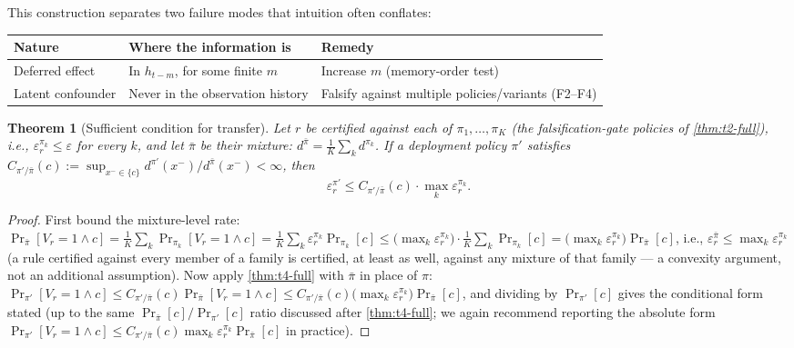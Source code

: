 \documentclass[11pt]{article}
\theoremstyle{plain}
\newtheorem{theorem}{Theorem}[section]
\theoremstyle{definition}
\theoremstyle{remark}
\begin{document}
This construction separates two failure modes that intuition often conflates:
\begin{center}
\begin{tabular}{@{}p{3.1cm}p{3.6cm}p{4.2cm}@{}}
\toprule
Nature & Where the information is & Remedy \\
\midrule
Deferred effect & In $h_{t-m}$, for some finite $m$ & Increase $m$ (memory-order test) \\
Latent confounder & Never in the observation history & Falsify against multiple policies/variants (F2--F4) \\
\bottomrule
\end{tabular}
\end{center}

\begin{theorem}[Sufficient condition for transfer]
\label{thm:t7-full}
Let $r$ be certified against each of $\pi_1,\dots,\pi_K$ (the falsification-gate policies of \autoref{thm:t2-full}), i.e., $\varepsilon^{\pi_k}_r\le\varepsilon$ for every $k$, and let $\bar\pi$ be their mixture: $d^{\bar\pi}=\frac1K\sum_k d^{\pi_k}$. If a deployment policy $\pi'$ satisfies $C_{\pi'/\bar\pi}(c):=\sup_{x^-\in\{c\}}d^{\pi'}(x^-)/d^{\bar\pi}(x^-)<\infty$, then
$$\varepsilon^{\pi'}_r \le C_{\pi'/\bar\pi}(c)\cdot\max_k\varepsilon^{\pi_k}_r.$$
\end{theorem}
\begin{proof}
First bound the mixture-level rate: $\Pr_{\bar\pi}[V_r=1\wedge c] = \frac1K\sum_k\Pr_{\pi_k}[V_r=1\wedge c] = \frac1K\sum_k \varepsilon^{\pi_k}_r\Pr_{\pi_k}[c] \le \big(\max_k\varepsilon^{\pi_k}_r\big)\cdot\frac1K\sum_k\Pr_{\pi_k}[c] = \big(\max_k\varepsilon^{\pi_k}_r\big)\Pr_{\bar\pi}[c]$, i.e., $\varepsilon^{\bar\pi}_r\le\max_k\varepsilon^{\pi_k}_r$ (a rule certified against every member of a family is certified, at least as well, against any mixture of that family --- a convexity argument, not an additional assumption). Now apply \autoref{thm:t4-full} with $\bar\pi$ in place of $\pi$: $\Pr_{\pi'}[V_r=1\wedge c]\le C_{\pi'/\bar\pi}(c)\Pr_{\bar\pi}[V_r=1\wedge c]\le C_{\pi'/\bar\pi}(c)\big(\max_k\varepsilon^{\pi_k}_r\big)\Pr_{\bar\pi}[c]$, and dividing by $\Pr_{\pi'}[c]$ gives the conditional form stated (up to the same $\Pr_{\bar\pi}[c]/\Pr_{\pi'}[c]$ ratio discussed after \autoref{thm:t4-full}; we again recommend reporting the absolute form $\Pr_{\pi'}[V_r=1\wedge c]\le C_{\pi'/\bar\pi}(c)\max_k\varepsilon^{\pi_k}_r\Pr_{\bar\pi}[c]$ in practice).
\end{proof}
\end{document}

